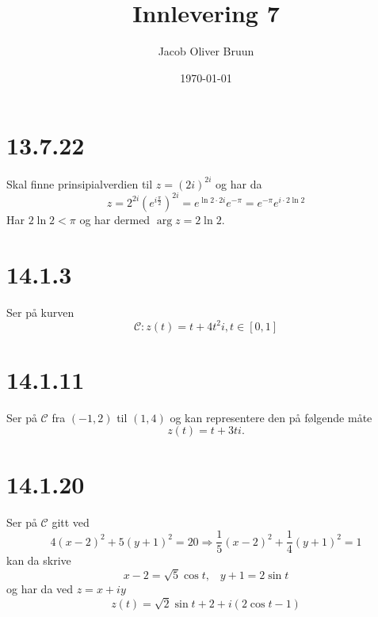 \documentclass{report}
\title{Innlevering 7}
\author{Jacob Oliver Bruun}
\date{\today}
\newcommand{\nbrack}[1]{\left( #1 \right)}
\newcommand{\bbrack}[1]{\left[ #1 \right]}
\begin{document}
\section*{13.7.22}
Skal finne prinsipialverdien til $z=(2i)^{2i}$ og har da
\begin{equation}
  \label{eq:1}
  z = 2^{2i} \nbrack{ e^{i\frac{\pi}{2}} }^{2i} = e^{\ln 2 \cdot 2i} e^{-\pi} = e^{-\pi}e^{i\cdot 2\ln 2}
\end{equation}
Har $2\ln 2 < \pi$ og har dermed $\arg z = 2\ln 2$.


\section*{14.1.3}
Ser på kurven
\begin{equation}
  \label{eq:2}
  \mathcal{C} : z(t) = t + 4t^{2}i, t \in \bbrack{ 0, 1 }
\end{equation}


\section*{14.1.11}
Ser på $\mathcal{C}$ fra $(-1,2)$ til $(1,4)$ og kan representere den på følgende måte
\begin{equation}
  \label{eq:3}
  z(t) = t + 3ti.
\end{equation}



\section*{14.1.20}
Ser på $\mathcal{C}$ gitt ved
\begin{equation}
  \label{eq:4}
  4(x-2)^{2} + 5(y+1)^{2} = 20 \Rightarrow \frac{1}{5}(x-2)^{2} + \frac{1}{4}(y+1)^{2} = 1
\end{equation}
kan da skrive
\begin{equation}
  \label{eq:5}
  x-2 = \sqrt{5} \cos t, \;\;\; y+1 = 2 \sin t
\end{equation}
og har da ved $z = x + iy$
\begin{equation}
  \label{eq:6}
  z(t) = \sqrt{2} \sin t + 2 + i\nbrack{ 2\cos t - 1 }
\end{equation}
\end{document}
